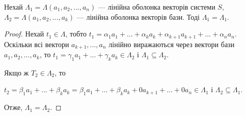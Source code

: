 \begin{claim}
	Нехай $\Lambda_1 = \Lambda(a_1, a_2, ..., a_n)$ --- лінійна оболонка векторів
	системи $S$, $\Lambda_2 = \Lambda(a_1, a_2, ..., a_k)$ --- лінійна оболонка векторів бази.
	Тоді $\Lambda_1 = \Lambda_1$.
\end{claim}
\begin{proof}
	Нехай $t_1 \in \Lambda$, тобто $t_1 = \alpha_1 a_1 + ... + \alpha_k a_k + \alpha_{k+1} a_{k+1} + ... + \alpha_n a_n$.
	Оскільки всі вектори $a_{k+1}, ..., a_n$ лінійно виражаються через вектори бази
	$a_1, a_2, ..., a_k$, то $t_1 = \gamma_1 a_1 + ... + \gamma_k a_k \in \Lambda_2$ і $\Lambda_1 \subseteq \Lambda_2$.

	Якщо ж $T_2 \in \Lambda_2$, то

	$t_2 = \beta_1 a_1 + ... + \beta_k a_k = \beta_1 a_1 + ... + \beta_k a_k + 0 a_{k+1} + ... + 0 a_{n} \in \Lambda_1$ і $\Lambda_2 \subseteq \Lambda_1$.

	Отже, $\Lambda_1 = \Lambda_2$.
\end{proof}

